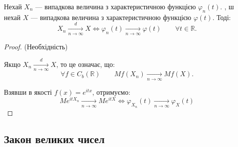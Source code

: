 \begin{theorem}[Неперервність]
    Нехай $X_n$ --- випадкова величина з
    характеристичною функцією $\varphi_n(t)$.
    , ш нехай $X$ --- випадкова величина з
    характеристичною функцією $\varphi(t)$.
    Тоді:
    $$X_n \xrightarrow[n \rightarrow \infty]{d} X \Leftrightarrow
    \varphi_n(t) \xrightarrow[n \rightarrow \infty]{} \varphi(t)
    \qquad \forall t \in \mathbb{R}.$$
\end{theorem}
\begin{proof}
    (Необхідність)
    
    Якщо $X_n \xrightarrow[n \rightarrow \infty]{d} X$, то це
    означає, що:
    $$\forall f \in C_b(\mathbb{R}) \qquad Mf(X_n) \xrightarrow[n \rightarrow \infty]{} Mf(X).$$

    Взявши в якості $f(x) = e^{itx}$, отримуємо:
    $$M e^{itX_n} \xrightarrow[n \rightarrow \infty]{} M e^{itX} \Leftrightarrow
    \varphi_{X_n}(t) \xrightarrow[n \rightarrow \infty]{} \varphi_{X}(t)$$
\end{proof}


\subsection{Закон великих чисел}

